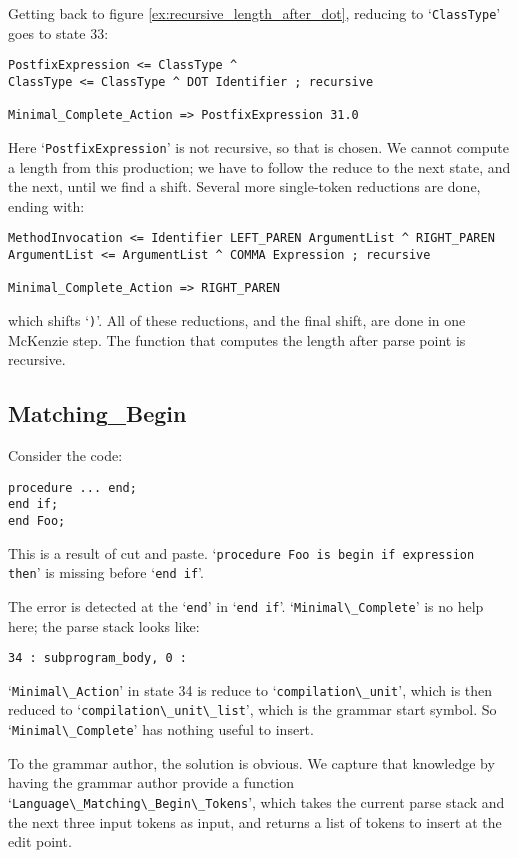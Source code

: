 \documentclass{article}
\newcommand{\code}[1]{`\lstinline|#1|'}
\begin{document}
Getting back to figure \ref{ex:recursive_length_after_dot}, reducing
to \code{ClassType} goes to state 33:
\begin{verbatim}
PostfixExpression <= ClassType ^
ClassType <= ClassType ^ DOT Identifier ; recursive

Minimal_Complete_Action => PostfixExpression 31.0
\end{verbatim}
Here \code{PostfixExpression} is not recursive, so that is chosen. We
cannot compute a length from this production; we have to follow the
reduce to the next state, and the next, until we find a shift.
Several more single-token reductions are done, ending with:
\begin{verbatim}
MethodInvocation <= Identifier LEFT_PAREN ArgumentList ^ RIGHT_PAREN
ArgumentList <= ArgumentList ^ COMMA Expression ; recursive

Minimal_Complete_Action => RIGHT_PAREN
\end{verbatim}
which shifts \code{)}. All of these reductions, and the final shift,
are done in one McKenzie step. The function that computes the length
after parse point is recursive.

\subsection{Matching\_Begin}
Consider the code:
\begin{lstlisting}
procedure ... end;
end if;
end Foo;
\end{lstlisting}
This is a result of cut and paste.
\code{procedure Foo is begin if expression then} is missing before
\code{end if}.

The error is detected at the \code{end} in \code{end if}.
\code{Minimal\_Complete} is no help here; the parse stack looks like:
\begin{verbatim}
34 : subprogram_body, 0 :
\end{verbatim}
\code{Minimal\_Action} in state 34 is reduce to
\code{compilation\_unit}, which is then reduced to
\code{compilation\_unit\_list}, which is the grammar start symbol. So
\code{Minimal\_Complete} has nothing useful to insert.

To the grammar author, the solution is obvious. We capture that
knowledge by having the grammar author provide a function
\code{Language\_Matching\_Begin\_Tokens}, which takes the current parse
stack and the next three input tokens as input, and returns a list of
tokens to insert at the edit point.
\end{document}
